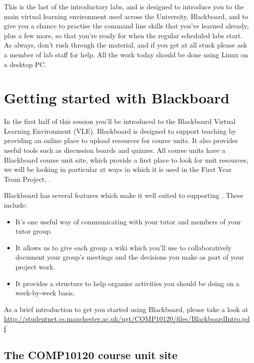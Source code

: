 \begin{firstonly}

  This is the last of the introductory labs, and is designed to
  introduce you to the main virtual learning environment used across
  the University, Blackboard, and to give you a chance to practise the
  command line skills that you've learned already, plus a few more, so
  that you're ready for when the regular scheduled labs start. As
  always, don't rush through the material, and if you get at all stuck
  please ask a member of lab staff for help. All the work today should be done using Linux on a desktop PC.

\section{Getting started with Blackboard}
\label{sec:introduction-blackboard}

In the first half of this session you'll be introduced to the
Blackboard Virtual Learning Environment (VLE). Blackboard is designed
to support teaching by providing an online place to upload resources
for course units. It also provides useful tools such as discussion
boards and quizzes. All course units have a Blackboard course unit
site, which provide a first place to look for unit resources; we will
be looking in particular at ways in which it is used in the First Year
Team Project, .


Blackboard has several features which make it well suited to supporting . These include:
\begin{itemize}
\item It's one useful way of communicating with your tutor and members of your tutor group.
\item It allows us to give each group a wiki which you'll use to collaboratively document your group's meetings and the decisions you make as part of  your project work.
\item It provides a structure to help organise activities you should be doing on a week-by-week basis.
\end{itemize}

As a brief introduction to get you started using Blackboard, please take a look at \\ {\small\url{http://studentnet.cs.manchester.ac.uk/ugt/COMP10120/files/BlackboardIntro.pdf}}

\subsection{The COMP10120 course unit site}
\label{sec:comp10120-course-uni}


\end{firstonly}

